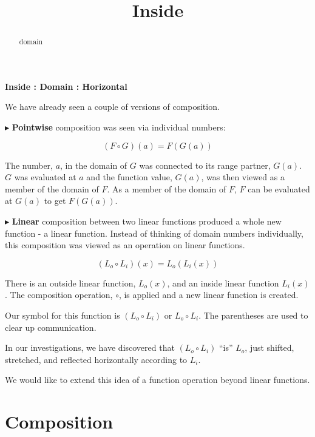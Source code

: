 \documentclass{ximera}
\title{Inside}
\begin{document}
\begin{abstract}
domain
\end{abstract}
\maketitle






\textbf{\textcolor{blue!55!black}{Inside : Domain : Horizontal}}




We have already seen a couple of versions of composition. 

$\blacktriangleright$ \textbf{\textcolor{purple!85!blue}{Pointwise}} composition was seen via individual numbers: 

\[ (F \circ G)(a) = F(G(a)) \]

The number, $a$, in the domain of $G$ was connected to its range partner, $G(a)$.  $G$ was evaluated at $a$ and the function value, $G(a)$, was then viewed as a member of the domain of $F$.  As a member of the domain of $F$, $F$ can be evaluated at $G(a)$ to get $F(G(a))$. 




$\blacktriangleright$ \textbf{\textcolor{purple!85!blue}{Linear}} composition between two linear functions produced a whole new function - a linear function.  Instead of thinking of domain numbers individually, this composition was viewed as an operation on linear functions.

\[    (L_o \circ L_i)(x) = L_o(L_i(x))  \]

There is an outside linear function, $L_o(x)$, and an inside linear function $L_i(x)$.  The composition operation, $\circ$, is applied and a new linear function is created.  



Our symbol for this function is $(L_o \circ L_i)$ or $L_o \circ L_i$.  The parentheses are used to clear up communication.

In our investigations, we have discovered that $(L_o \circ L_i)$ ``is'' $L_o$, just shifted, stretched, and reflected horizontally according to $L_i$.


We would like to extend this idea of a function operation beyond linear functions.





\section*{Composition}
\end{document}
